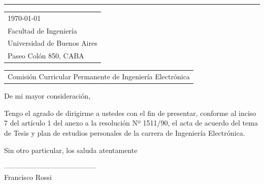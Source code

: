 \documentclass{article}
\begin{document}
\vspace{-1em} %

\rule{\linewidth}{1pt} %

\bigskip\bigskip %


\hfill
\begin{tabular}{l @{}}
	\today \bigskip\\ %
	Facultad de Ingeniería \\
	Universidad de Buenos Aires \\
	Paseo Colón 850, CABA
\end{tabular}

\bigskip %


\begin{tabular}{@{} l}
	Comisión Curricular Permanente de Ingeniería Electrónica
\end{tabular}

\bigskip

De mi mayor consideración,

\bigskip


Tengo el agrado de dirigirme a ustedes con el fin de presentar, conforme al inciso 7 del artículo 1 del anexo a la resolución Nº 1511/90, el acta  de acuerdo del tema de Tesis y plan de estudios personales de la carrera de Ingeniería Electrónica.


\bigskip %

Sin otro particular, los saluda atentamente

\vspace{100pt} %

---------------------------------------
\\
Francisco Rossi
\end{document}
